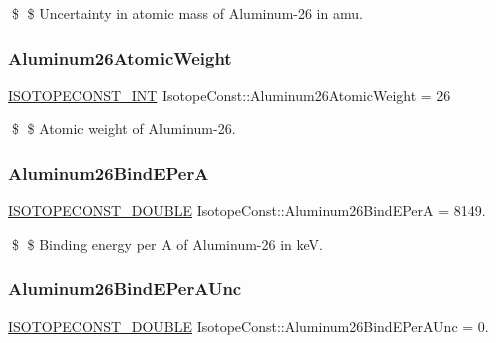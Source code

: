 \$ \$ Uncertainty in atomic mass of Aluminum-\/26 in amu. \mbox{\label{group___isotope_const-_aluminum-_al26_gaee4115ce74955a2cc6c482fdaf4b7cfb}} 
\subsubsection{\texorpdfstring{Aluminum26\+Atomic\+Weight}{Aluminum26AtomicWeight}}
{\footnotesize\ttfamily \mbox{\hyperlink{group___isotope_const-_macros_ga5f18360b3e99483a35c32d789e62621c}{I\+S\+O\+T\+O\+P\+E\+C\+O\+N\+S\+T\+\_\+\+I\+NT}} Isotope\+Const\+::\+Aluminum26\+Atomic\+Weight = 26}

\$ \$ Atomic weight of Aluminum-\/26. \mbox{\label{group___isotope_const-_aluminum-_al26_gaa3359c944b69f6d83a3306ed9c28f0cb}} 
\subsubsection{\texorpdfstring{Aluminum26\+Bind\+E\+PerA}{Aluminum26BindEPerA}}
{\footnotesize\ttfamily \mbox{\hyperlink{group___isotope_const-_macros_ga8f45a7272ce02c0b4c65c44636ed719a}{I\+S\+O\+T\+O\+P\+E\+C\+O\+N\+S\+T\+\_\+\+D\+O\+U\+B\+LE}} Isotope\+Const\+::\+Aluminum26\+Bind\+E\+PerA = 8149.}

\$ \$ Binding energy per A of Aluminum-\/26 in keV. \mbox{\label{group___isotope_const-_aluminum-_al26_ga1d1c94f8730f9ad15a8bb08fc3cff45c}} 
\subsubsection{\texorpdfstring{Aluminum26\+Bind\+E\+Per\+A\+Unc}{Aluminum26BindEPerAUnc}}
{\footnotesize\ttfamily \mbox{\hyperlink{group___isotope_const-_macros_ga8f45a7272ce02c0b4c65c44636ed719a}{I\+S\+O\+T\+O\+P\+E\+C\+O\+N\+S\+T\+\_\+\+D\+O\+U\+B\+LE}} Isotope\+Const\+::\+Aluminum26\+Bind\+E\+Per\+A\+Unc = 0.}

